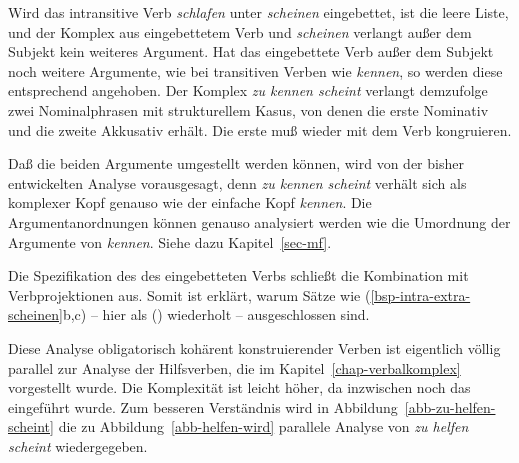 {Wird das intransitive Verb \emph{schlafen} unter \emph{scheinen} eingebettet,
ist  die leere Liste, und der Komplex aus eingebettetem Verb und \emph{scheinen}
verlangt außer dem Subjekt kein weiteres Argument. Hat das eingebettete Verb 
außer dem Subjekt noch weitere Argumente, wie \zb bei transitiven Verben wie \emph{kennen},
so werden diese entsprechend angehoben. Der Komplex \emph{zu kennen scheint} verlangt
demzufolge zwei Nominalphrasen mit strukturellem Kasus, von denen die erste Nominativ
und die zweite Akkusativ erhält. Die erste muß wieder mit dem Verb kongruieren.

Daß die beiden Argumente umgestellt werden können, wird von der bisher entwickelten
Analyse vorausgesagt, denn \emph{zu kennen scheint} verhält sich als komplexer Kopf
genauso wie der einfache Kopf \emph{kennen}. Die Argumentanordnungen können genauso
analysiert werden wie die Umordnung der Argumente von \emph{kennen}. Siehe dazu
Kapitel~\ref{sec-mf}.

Die Spezifikation des \lexwes des eingebetteten Verbs schließt die Kombination
mit Verbprojektionen aus. Somit ist erklärt, warum Sätze wie (\ref{bsp-intra-extra-scheinen}b,c) -- hier
als () wiederholt -- ausgeschlossen sind.
\eal
{}
\zl


\noindent
Diese Analyse obligatorisch kohärent konstruierender Verben ist eigentlich völlig parallel
zur Analyse der Hilfsverben, die im Kapitel~\ref{chap-verbalkomplex} vorgestellt wurde. Die Komplexität
ist leicht höher, da inzwischen noch das \subjm eingeführt wurde. Zum besseren Verständnis
wird in Abbildung~\vref{abb-zu-helfen-scheint} die zu Abbildung~\vref{abb-helfen-wird} parallele Analyse von \emph{zu helfen scheint}
wiedergegeben.

}
